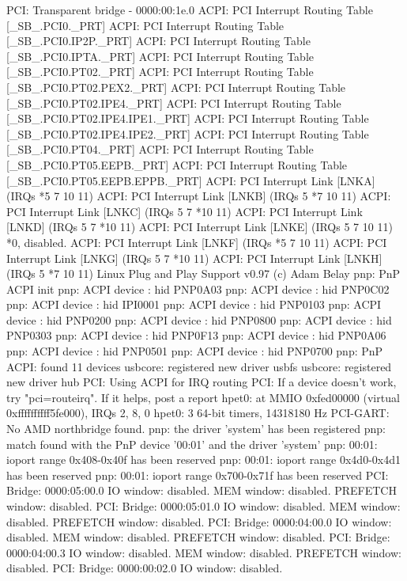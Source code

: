 \documentclass[mingoth,a4paper]{jsarticle}
\begin{document}
{{{{{{{{{{{{{{{{{\begin{commandline}
PCI: Transparent bridge - 0000:00:1e.0
ACPI: PCI Interrupt Routing Table [\_SB_.PCI0._PRT]
ACPI: PCI Interrupt Routing Table [\_SB_.PCI0.IP2P._PRT]
ACPI: PCI Interrupt Routing Table [\_SB_.PCI0.IPTA._PRT]
ACPI: PCI Interrupt Routing Table [\_SB_.PCI0.PT02._PRT]
ACPI: PCI Interrupt Routing Table [\_SB_.PCI0.PT02.PEX2._PRT]
ACPI: PCI Interrupt Routing Table [\_SB_.PCI0.PT02.IPE4._PRT]
ACPI: PCI Interrupt Routing Table [\_SB_.PCI0.PT02.IPE4.IPE1._PRT]
ACPI: PCI Interrupt Routing Table [\_SB_.PCI0.PT02.IPE4.IPE2._PRT]
ACPI: PCI Interrupt Routing Table [\_SB_.PCI0.PT04._PRT]
ACPI: PCI Interrupt Routing Table [\_SB_.PCI0.PT05.EEPB._PRT]
ACPI: PCI Interrupt Routing Table [\_SB_.PCI0.PT05.EEPB.EPPB._PRT]
ACPI: PCI Interrupt Link [LNKA] (IRQs *5 7 10 11)
ACPI: PCI Interrupt Link [LNKB] (IRQs 5 *7 10 11)
ACPI: PCI Interrupt Link [LNKC] (IRQs 5 7 *10 11)
ACPI: PCI Interrupt Link [LNKD] (IRQs 5 7 *10 11)
ACPI: PCI Interrupt Link [LNKE] (IRQs 5 7 10 11) *0, disabled.
ACPI: PCI Interrupt Link [LNKF] (IRQs *5 7 10 11)
ACPI: PCI Interrupt Link [LNKG] (IRQs 5 7 *10 11)
ACPI: PCI Interrupt Link [LNKH] (IRQs 5 *7 10 11)
Linux Plug and Play Support v0.97 (c) Adam Belay
pnp: PnP ACPI init
pnp: ACPI device : hid PNP0A03
pnp: ACPI device : hid PNP0C02
pnp: ACPI device : hid IPI0001
pnp: ACPI device : hid PNP0103
pnp: ACPI device : hid PNP0200
pnp: ACPI device : hid PNP0800
pnp: ACPI device : hid PNP0303
pnp: ACPI device : hid PNP0F13
pnp: ACPI device : hid PNP0A06
pnp: ACPI device : hid PNP0501
pnp: ACPI device : hid PNP0700
pnp: PnP ACPI: found 11 devices
usbcore: registered new driver usbfs
usbcore: registered new driver hub
PCI: Using ACPI for IRQ routing
PCI: If a device doesn't work, try "pci=routeirq".  If it helps, post a report
hpet0: at MMIO 0xfed00000 (virtual 0xffffffffff5fe000), IRQs 2, 8, 0
hpet0: 3 64-bit timers, 14318180 Hz
PCI-GART: No AMD northbridge found.
pnp: the driver 'system' has been registered
pnp: match found with the PnP device '00:01' and the driver 'system'
pnp: 00:01: ioport range 0x408-0x40f has been reserved
pnp: 00:01: ioport range 0x4d0-0x4d1 has been reserved
pnp: 00:01: ioport range 0x700-0x71f has been reserved
PCI: Bridge: 0000:05:00.0
  IO window: disabled.
  MEM window: disabled.
  PREFETCH window: disabled.
PCI: Bridge: 0000:05:01.0
  IO window: disabled.
  MEM window: disabled.
  PREFETCH window: disabled.
PCI: Bridge: 0000:04:00.0
  IO window: disabled.
  MEM window: disabled.
  PREFETCH window: disabled.
PCI: Bridge: 0000:04:00.3
  IO window: disabled.
  MEM window: disabled.
  PREFETCH window: disabled.
PCI: Bridge: 0000:00:02.0
  IO window: disabled.

\end{commandline}}}}}}}}}}}}}}}}}}
\end{document}
